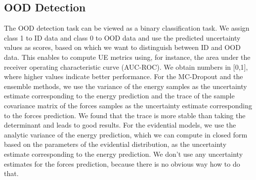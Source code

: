 \subsection{OOD Detection}
The OOD detection task can be viewed as a binary classification task. We assign class 1 to ID data and class 0 to OOD data and use the predicted uncertainty values as scores, based on which we want to distinguish between ID and OOD data. This enables to compute UE metrics using, for instance, the area under the receiver operating characteristic curve (AUC-ROC). We obtain numbers in [0,1], where higher values indicate better performance. For the MC-Dropout and the ensemble methods, we use the variance of the energy samples as the uncertainty estimate corresponding to the energy prediction and the trace of the sample covariance matrix of the forces samples as the uncertainty estimate corresponding to the forces prediction. We found that the trace is more stable than taking the determinant and leads to good results. For the evidential models, we use the analytic variance of the energy prediction, which we can compute in closed form based on the parameters of the evidential distribution, as the uncertainty estimate corresponding to the energy prediction. We don't use any uncertainty estimates for the forces prediction, because there is no obvious way how to do that.